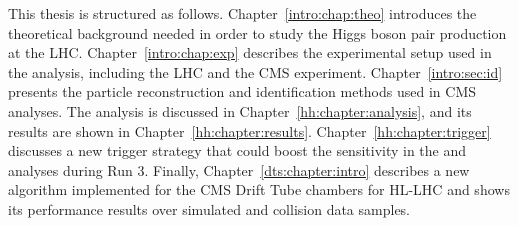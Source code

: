 \documentclass[../main.tex]{subfiles}
\begin{document}
This thesis is structured as follows. Chapter~\ref{intro:chap:theo} introduces the theoretical background needed in order to study the Higgs boson pair production at the LHC. Chapter~\ref{intro:chap:exp} describes the experimental setup used in the analysis, including the LHC and the CMS experiment. Chapter~\ref{intro:sec:id} presents the particle reconstruction and identification methods used in CMS analyses. The \hhbbtt{} analysis is discussed in Chapter~\ref{hh:chapter:analysis}, and its results are shown in Chapter~\ref{hh:chapter:results}. Chapter~\ref{hh:chapter:trigger} discusses a new trigger strategy that could boost the sensitivity in the \hhbbtt{} and \htt{} analyses during Run 3. Finally, Chapter~\ref{dts:chapter:intro} describes a new algorithm implemented for the CMS Drift Tube chambers for HL-LHC and shows its performance results over simulated and collision data samples.
\end{document}
